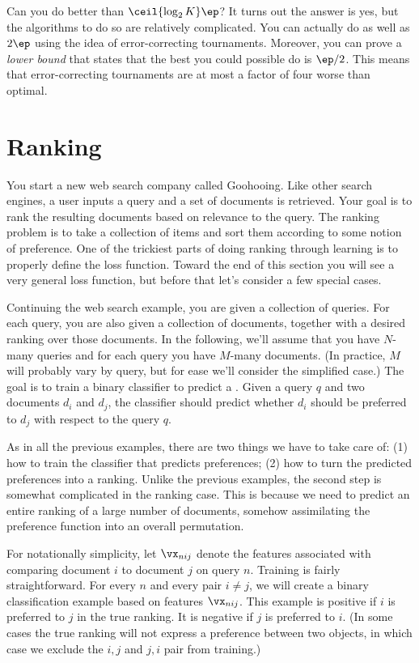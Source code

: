 Can you do better than $\ceil{\log_2 K}\ep$?  It turns out the answer
is yes, but the algorithms to do so are relatively complicated.  You
can actually do as well as $2\ep$ using the idea of error-correcting
tournaments.  Moreover, you can prove a \emph{lower bound} that states
that the best you could possible do is $\ep/2$.  This means that
error-correcting tournaments are at most a factor of four worse than
optimal.

\section{Ranking}

You start a new web search company called Goohooing.  Like other
search engines, a user inputs a query and a set of documents is
retrieved.  Your goal is to rank the resulting documents based on
relevance to the query.  The ranking problem is to take a collection
of items and sort them according to some notion of preference.  One of
the trickiest parts of doing ranking through learning is to properly
define the loss function.  Toward the end of this section you will see
a very general loss function, but before that let's consider a few
special cases.

Continuing the web search example, you are given a collection of
queries.  For each query, you are also given a collection of
documents, together with a desired ranking over those documents.  In
the following, we'll assume that you have $N$-many queries and for
each query you have $M$-many documents.  (In practice, $M$ will
probably vary by query, but for ease we'll consider the simplified
case.)  The goal is to train a binary classifier to predict a
.  Given a query $q$ and two documents
$d_i$ and $d_j$, the classifier should predict whether $d_i$ should be
preferred to $d_j$ with respect to the query $q$.

As in all the previous examples, there are two things we have to take
care of: (1) how to train the classifier that predicts preferences;
(2) how to turn the predicted preferences into a ranking.  Unlike the
previous examples, the second step is somewhat complicated in the
ranking case.  This is because we need to predict an entire ranking of
a large number of documents, somehow assimilating the preference
function into an overall permutation.

For notationally simplicity, let $\vx_{nij}$ denote the features
associated with comparing document $i$ to document $j$ on query $n$.
Training is fairly straightforward.  For every $n$ and every pair $i
\neq j$, we will create a binary classification example based on
features $\vx_{nij}$.  This example is positive if $i$ is preferred to
$j$ in the true ranking.  It is negative if $j$ is preferred to $i$.
(In some cases the true ranking will not express a preference between
two objects, in which case we exclude the $i,j$ and $j,i$ pair from
training.)

